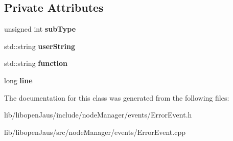 \subsection*{\-Private \-Attributes}
\begin{DoxyCompactItemize}
\item 
\hypertarget{class_error_event_a0abdb4444610b507821c2c7acbc7d086}{unsigned int {\bfseries sub\-Type}}\label{class_error_event_a0abdb4444610b507821c2c7acbc7d086}

\item 
\hypertarget{class_error_event_a64d020e588efe63dcd33f9fd0aaa1475}{std\-::string {\bfseries user\-String}}\label{class_error_event_a64d020e588efe63dcd33f9fd0aaa1475}

\item 
\hypertarget{class_error_event_a562e7d2f7cc406591a74b9aaf2258aad}{std\-::string {\bfseries function}}\label{class_error_event_a562e7d2f7cc406591a74b9aaf2258aad}

\item 
\hypertarget{class_error_event_a0bb95193dbe83ab4369a4cc7121d8ad2}{long {\bfseries line}}\label{class_error_event_a0bb95193dbe83ab4369a4cc7121d8ad2}

\end{DoxyCompactItemize}


\-The documentation for this class was generated from the following files\-:\begin{DoxyCompactItemize}
\item 
lib/libopen\-Jaus/include/node\-Manager/events/\-Error\-Event.\-h\item 
lib/libopen\-Jaus/src/node\-Manager/events/\-Error\-Event.\-cpp\end{DoxyCompactItemize}
